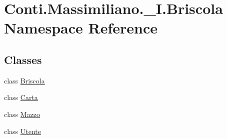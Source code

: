 \hypertarget{namespace_conti_1_1_massimiliano_1_1__5_i_1_1_briscola}{}\section{Conti.\+Massimiliano.\+\_\+I.\+Briscola Namespace Reference}
\label{namespace_conti_1_1_massimiliano_1_1__5_i_1_1_briscola}
\subsection*{Classes}
\begin{DoxyCompactItemize}
\item 
class \hyperlink{class_conti_1_1_massimiliano_1_1__5_i_1_1_briscola_1_1_briscola}{Briscola}
\item 
class \hyperlink{class_conti_1_1_massimiliano_1_1__5_i_1_1_briscola_1_1_carta}{Carta}
\item 
class \hyperlink{class_conti_1_1_massimiliano_1_1__5_i_1_1_briscola_1_1_mazzo}{Mazzo}
\item 
class \hyperlink{class_conti_1_1_massimiliano_1_1__5_i_1_1_briscola_1_1_utente}{Utente}
\end{DoxyCompactItemize}
